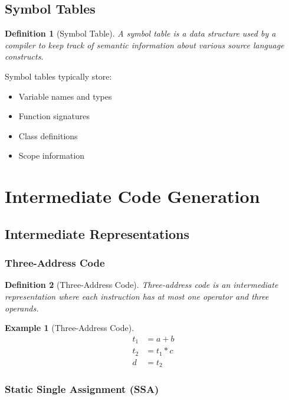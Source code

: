 \documentclass[11pt]{article}
\newtheorem{definition}{Definition}[section]
\newtheorem{example}{Example}[section]
\begin{document}
\subsection{Symbol Tables}

\begin{definition}[Symbol Table]
A symbol table is a data structure used by a compiler to keep track of semantic information about various source language constructs.
\end{definition}

Symbol tables typically store:
\begin{itemize}
    \item Variable names and types
    \item Function signatures
    \item Class definitions
    \item Scope information
\end{itemize}

\section{Intermediate Code Generation}

\subsection{Intermediate Representations}

\subsubsection{Three-Address Code}

\begin{definition}[Three-Address Code]
Three-address code is an intermediate representation where each instruction has at most one operator and three operands.
\end{definition}

\begin{example}[Three-Address Code]
\begin{align}
t_1 &= a + b \\
t_2 &= t_1 * c \\
d &= t_2
\end{align}
\end{example}

\subsubsection{Static Single Assignment (SSA)}
\end{document}
